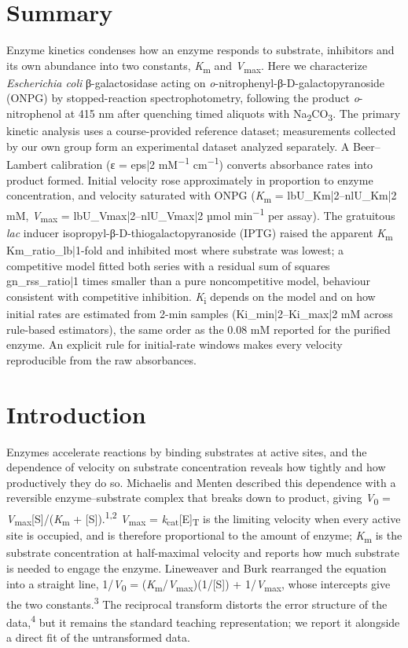 \documentclass[9pt,twocolumn]{extarticle}
\newcommand{\cit}[1]{\textsuperscript{#1}}
\newcommand{\Km}{\textit{K}\textsubscript{m}}
\newcommand{\Vmax}{\textit{V}\textsubscript{max}}
\newcommand{\Vo}{\textit{V}\textsubscript{0}}
\newcommand{\Ki}{\textit{K}\textsubscript{i}}
\newcommand{\kcat}{\textit{k}\textsubscript{cat}}
\newcommand{\umolmin}{µmol min\textsuperscript{−1}}
\newcommand{\epsunits}{mM\textsuperscript{−1} cm\textsuperscript{−1}}
\newcommand{\Ecoli}{\textit{Escherichia coli}}
\newcommand{\lac}{\textit{lac}}
\newcommand{\onp}{\textit{o}-nitrophenol}
\newcommand{\dash}{–}
\begin{document}
\section{Summary}
Enzyme kinetics condenses how an enzyme responds to substrate, inhibitors and its own abundance into two constants, \Km{} and \Vmax. Here we characterize \Ecoli{} β-galactosidase acting on \textit{o}-nitrophenyl-β-D-galactopyranoside (ONPG) by stopped-reaction spectrophotometry, following the product \onp{} at 415 nm after quenching timed aliquots with Na\textsubscript{2}CO\textsubscript{3}. The primary kinetic analysis uses a course-provided reference dataset; measurements collected by our own group form an experimental dataset analyzed separately. A Beer\dash Lambert calibration (ε = {{eps|2}} \epsunits) converts absorbance rates into product formed. Initial velocity rose approximately in proportion to enzyme concentration, and velocity saturated with ONPG (\Km{} = {{lbU_Km|2}}\dash{{nlU_Km|2}} mM, \Vmax{} = {{lbU_Vmax|2}}\dash{{nlU_Vmax|2}} \umolmin{} per assay). The gratuitous \lac{} inducer isopropyl-β-D-thiogalactopyranoside (IPTG) raised the apparent \Km{} {{Km_ratio_lb|1}}-fold and inhibited most where substrate was lowest; a competitive model fitted both series with a residual sum of squares {{gn_rss_ratio|1}} times smaller than a pure noncompetitive model, behaviour consistent with competitive inhibition. \Ki{} depends on the model and on how initial rates are estimated from 2-min samples ({{Ki_min|2}}\dash{{Ki_max|2}} mM across rule-based estimators), the same order as the 0.08 mM reported for the purified enzyme. An explicit rule for initial-rate windows makes every velocity reproducible from the raw absorbances.

\section{Introduction}
Enzymes accelerate reactions by binding substrates at active sites, and the dependence of velocity on substrate concentration reveals how tightly and how productively they do so. Michaelis and Menten described this dependence with a reversible enzyme\dash substrate complex that breaks down to product, giving \Vo{} = \Vmax[S]/(\Km{} + [S]).\cit{1,2} \Vmax{} = \kcat[E]\textsubscript{T} is the limiting velocity when every active site is occupied, and is therefore proportional to the amount of enzyme; \Km{} is the substrate concentration at half-maximal velocity and reports how much substrate is needed to engage the enzyme. Lineweaver and Burk rearranged the equation into a straight line, 1/\Vo{} = (\Km/\Vmax)(1/[S]) + 1/\Vmax, whose intercepts give the two constants.\cit{3} The reciprocal transform distorts the error structure of the data,\cit{4} but it remains the standard teaching representation; we report it alongside a direct fit of the untransformed data.
\end{document}
